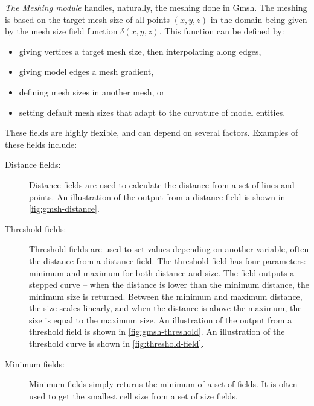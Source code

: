 \emph{The Meshing module} handles, naturally, the meshing done in Gmsh. The meshing is based on the target mesh size of all points $(x, y, z)$ in the domain being given by the mesh size field function $\delta(x, y, z)$. This function can be defined by:
\begin{itemize}
    \item giving vertices a target mesh size, then interpolating along edges,
    \item giving model edges a mesh gradient,
    \item defining mesh sizes in another mesh, or
    \item setting default mesh sizes that adapt to the curvature of model entities.
\end{itemize}
These fields are highly flexible, and can depend on several factors. Examples of these fields include:
\begin{description}
    \item[Distance fields:] Distance fields are used to calculate the distance from a set of lines and points. An illustration of the output from a distance field is shown in \autoref{fig:gmsh-distance}.
    \item[Threshold fields:] Threshold fields are used to set values depending on another variable, often the distance from a distance field. The threshold field has four parameters: minimum and maximum for both distance and size. The field outputs a stepped curve -- when the distance is lower than the minimum distance, the minimum size is returned. Between the minimum and maximum distance, the size scales linearly, and when the distance is above the maximum, the size is equal to the maximum size. An illustration of the output from a threshold field is shown in \autoref{fig:gmsh-threshold}. An illustration of the threshold curve is shown in \autoref{fig:threshold-field}. 
    
    \item[Minimum fields:] Minimum fields simply returns the minimum of a set of fields. It is often used to get the smallest cell size from a set of size fields.
\end{description}

